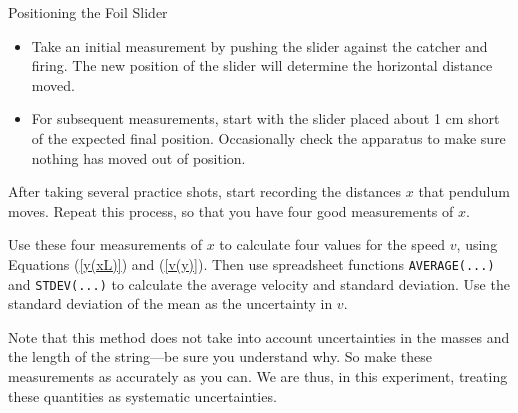 \item Positioning the Foil Slider

	\begin{itemize}

	\item Take an initial measurement by pushing the slider
         against the catcher and firing.  The new position of the
         slider will determine the horizontal distance moved.

	\item  For subsequent measurements, start with the slider
        placed about 1 cm short of the expected final position.
        Occasionally check the apparatus to make sure nothing has
        moved out of position.
	
	\end{itemize}

\item After taking several practice shots,
start recording the distances $x$ that pendulum moves.
Repeat this process, so that you have  four good 
measurements of $x$.  


\item Use these four measurements of $x$ to calculate four values for
the speed $v$, using Equations (\ref{y(xL)}) and (\ref{v(y)}).  Then
use spreadsheet functions {\tt AVERAGE(...)} and {\tt STDEV(...)}
to calculate the average velocity and standard deviation.  Use the standard
deviation of the mean as the uncertainty in $v$.

Note that this method does not take into account uncertainties in the
masses and the length of the string---be sure you understand why.  So
make these measurements as accurately as you can.  We are thus, in this
experiment, treating these quantities as systematic uncertainties.

                                                                    

